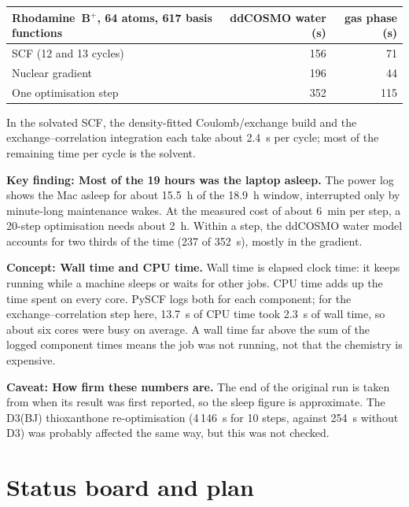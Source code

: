 \documentclass[11pt,a4paper]{article}
\newcommand{\notehead}[2]{\par\smallskip\noindent\textbf{#1: #2.}\enspace}
\begin{document}
\begin{center}\small
\begin{tabular}{@{}lrr@{}}
\toprule
Rhodamine~B$^+$, 64 atoms, 617 basis functions & ddCOSMO water (s) & gas phase (s) \\
\midrule
SCF (12 and 13 cycles) & 156 & 71 \\
Nuclear gradient & 196 & 44 \\
\midrule
One optimisation step & 352 & 115 \\
\bottomrule
\end{tabular}
\end{center}

\noindent In the solvated SCF, the density-fitted Coulomb/exchange build and the exchange--correlation
integration each take about 2.4~s per cycle; most of the remaining time per cycle is the solvent.

\notehead{Key finding}{Most of the 19 hours was the laptop asleep}
The power log shows the Mac asleep for about 15.5~h of the 18.9~h window, interrupted only by
minute-long maintenance wakes. At the measured cost of about 6~min per step, a 20-step optimisation
needs about 2~h. Within a step, the ddCOSMO water model accounts for two thirds of the time (237 of
352~s), mostly in the gradient.
\par\smallskip

\notehead{Concept}{Wall time and CPU time}
Wall time is elapsed clock time: it keeps running while a machine sleeps or waits for other jobs.
CPU time adds up the time spent on every core. PySCF logs both for each component; for the
exchange--correlation step here, 13.7~s of CPU time took 2.3~s of wall time, so about six cores were
busy on average. A wall time far above the sum of the logged component times means the job was not
running, not that the chemistry is expensive.
\par\smallskip

\notehead{Caveat}{How firm these numbers are}
The end of the original run is taken from when its result was first reported, so the sleep figure is
approximate. The D3(BJ) thioxanthone re-optimisation (4\,146~s for 10 steps, against 254~s without
D3) was probably affected the same way, but this was not checked.
\par\smallskip

\section{Status board and plan}
\end{document}
